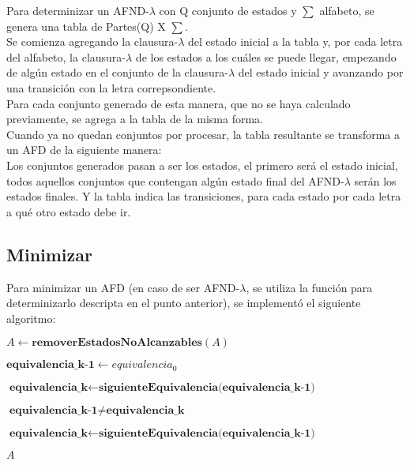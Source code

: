 Para determinizar un AFND-$\lambda$ con Q conjunto de estados y $\sum$ alfabeto, se genera una tabla de Partes(Q) X $\sum$.\\
Se comienza agregando la clausura-$\lambda$ del estado inicial a la tabla y, por cada letra del alfabeto, la clausura-$\lambda$ de los estados a los cuáles se puede llegar, empezando de algún estado en el conjunto de la clausura-$\lambda$ del estado inicial y avanzando por una transición con la letra correpsondiente.\\
Para cada conjunto generado de esta manera, que no se haya calculado previamente, se agrega a la tabla de la misma forma.\\
Cuando ya no quedan conjuntos por procesar, la tabla resultante se transforma a un AFD de la siguiente manera:\\
Los conjuntos generados pasan a ser los estados, el primero será el estado inicial, todos aquellos conjuntos que contengan algún estado final del AFND-$\lambda$ serán los estados finales. Y la tabla indica las transiciones, para cada estado por cada letra a qué otro estado debe ir.


\subsection{Minimizar}

Para minimizar un AFD (en caso de ser AFND-$\lambda$, se utiliza la función para determinizarlo descripta en el punto anterior), se implementó el siguiente algoritmo:

\begin{algorithm}
\begin{algorithmic}[1]

    \State $A \gets \textbf{removerEstadosNoAlcanzables}(A) $

    \State $\textbf{equivalencia_{k-1}} \gets equivalencia_{0}$

    \State $\textbf{equivalencia_{k}} \gets \textbf{siguienteEquivalencia(equivalencia_{k-1})}$
    
    \While $\textbf{equivalencia_{k-1}} \neq \textbf{equivalencia_{k}}$
    
    		\State $\textbf{equivalencia_{k}} \gets \textbf{siguienteEquivalencia(equivalencia_{k-1})}$

    \EndWhile

    \State \Return $A$
  \EndFunction
\end{algorithmic}
\end{algorithm}

